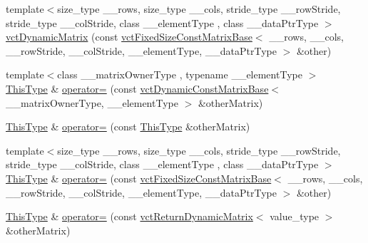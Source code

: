 \begin{DoxyCompactItemize}
\item 
{\footnotesize template$<$size\-\_\-type \-\_\-\-\_\-rows, size\-\_\-type \-\_\-\-\_\-cols, stride\-\_\-type \-\_\-\-\_\-row\-Stride, stride\-\_\-type \-\_\-\-\_\-col\-Stride, class \-\_\-\-\_\-element\-Type , class \-\_\-\-\_\-data\-Ptr\-Type $>$ }\\\hyperlink{classvct_dynamic_matrix_ab7a654d065180b208eb61efa2cf768c6}{vct\-Dynamic\-Matrix} (const \hyperlink{classvct_fixed_size_const_matrix_base}{vct\-Fixed\-Size\-Const\-Matrix\-Base}$<$ \-\_\-\-\_\-rows, \-\_\-\-\_\-cols, \-\_\-\-\_\-row\-Stride, \-\_\-\-\_\-col\-Stride, \-\_\-\-\_\-element\-Type, \-\_\-\-\_\-data\-Ptr\-Type $>$ \&other)
\item 
{\footnotesize template$<$class \-\_\-\-\_\-matrix\-Owner\-Type , typename \-\_\-\-\_\-element\-Type $>$ }\\\hyperlink{classvct_dynamic_const_matrix_base_ac4ff48cbe4d9de3fdef5a02447ffb9db}{This\-Type} \& \hyperlink{classvct_dynamic_matrix_ac0062998c00df7a4e5155c3eac8fddb0}{operator=} (const \hyperlink{classvct_dynamic_const_matrix_base}{vct\-Dynamic\-Const\-Matrix\-Base}$<$ \-\_\-\-\_\-matrix\-Owner\-Type, \-\_\-\-\_\-element\-Type $>$ \&other\-Matrix)
\item 
\hyperlink{classvct_dynamic_const_matrix_base_ac4ff48cbe4d9de3fdef5a02447ffb9db}{This\-Type} \& \hyperlink{classvct_dynamic_matrix_a1ba744edd673ccf244e0c7ad521e47d1}{operator=} (const \hyperlink{classvct_dynamic_const_matrix_base_ac4ff48cbe4d9de3fdef5a02447ffb9db}{This\-Type} \&other\-Matrix)
\item 
{\footnotesize template$<$size\-\_\-type \-\_\-\-\_\-rows, size\-\_\-type \-\_\-\-\_\-cols, stride\-\_\-type \-\_\-\-\_\-row\-Stride, stride\-\_\-type \-\_\-\-\_\-col\-Stride, class \-\_\-\-\_\-element\-Type , class \-\_\-\-\_\-data\-Ptr\-Type $>$ }\\\hyperlink{classvct_dynamic_const_matrix_base_ac4ff48cbe4d9de3fdef5a02447ffb9db}{This\-Type} \& \hyperlink{classvct_dynamic_matrix_a3ca1f15a54f2ae80c054535ed01a60c5}{operator=} (const \hyperlink{classvct_fixed_size_const_matrix_base}{vct\-Fixed\-Size\-Const\-Matrix\-Base}$<$ \-\_\-\-\_\-rows, \-\_\-\-\_\-cols, \-\_\-\-\_\-row\-Stride, \-\_\-\-\_\-col\-Stride, \-\_\-\-\_\-element\-Type, \-\_\-\-\_\-data\-Ptr\-Type $>$ \&other)
\item 
\hyperlink{classvct_dynamic_const_matrix_base_ac4ff48cbe4d9de3fdef5a02447ffb9db}{This\-Type} \& \hyperlink{classvct_dynamic_matrix_a8c20bdf6d0df4b4271cb970dd8f225bd}{operator=} (const \hyperlink{classvct_return_dynamic_matrix}{vct\-Return\-Dynamic\-Matrix}$<$ value\-\_\-type $>$ \&other\-Matrix)

\end{DoxyCompactItemize}

